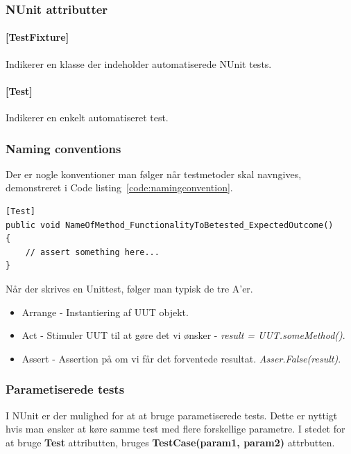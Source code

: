 \subsubsection{NUnit attributter}

\paragraph{[TestFixture]} Indikerer en klasse der indeholder automatiserede NUnit tests. 
\paragraph{[Test]} Indikerer en enkelt automatiseret test.

\subsubsection{Naming conventions}
Der er nogle konventioner man følger når testmetoder skal navngives, demonstreret i Code listing~\ref{code:namingconvention}.

\begin{lstlisting}[caption=Eksempel på navngivnings konvention for test.,label=code:namingconvention]
[Test]
public void NameOfMethod_FunctionalityToBetested_ExpectedOutcome()
{
	// assert something here...
}
\end{lstlisting}

Når der skrives en Unittest, følger man typisk de tre A'er.

\begin{itemize}
	\item Arrange - Instantiering af UUT objekt.
	\item Act - Stimuler UUT til at gøre det vi ønsker - \textit{result = UUT.someMethod()}.
	\item Assert - Assertion på om vi får det forventede resultat. \textit{Asser.False(result)}.
\end{itemize}

\subsubsection{Parametiserede tests}
I NUnit er der mulighed for at at bruge parametiserede tests. Dette er nyttigt hvis man ønsker at køre samme test med flere forskellige parametre. I stedet for at bruge \textbf{Test} attributten, bruges \textbf{TestCase(param1, param2)} attrbutten.


